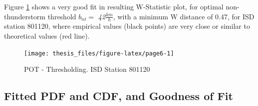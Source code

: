 \documentclass[12pt,twoside]{reedthesis}
\begin{document}
Figure \ref{fig:page6} shows a very good fit in resulting W-Statistic plot, for optimal non-thunderstorm threshold \(b_{nt} =\) \emph{42}\(\frac{km}{h}\), with a minimum W distance of 0.47, for ISD station 801120, where empirical values (black points) are very close or similar to theoretical values (red line).

\footnotesize
\begin{figure}

{\centering \texttt{[image: thesis\_files/figure-latex/page6-1]} 

}

\caption{POT - Thresholding. ISD Station 801120}\label{fig:page6}
\end{figure}
\normalsize

\hypertarget{fitted-pdf-and-cdf-and-goodness-of-fit}{%
\subsection{Fitted PDF and CDF, and Goodness of Fit}\label{fitted-pdf-and-cdf-and-goodness-of-fit}}
\end{document}
